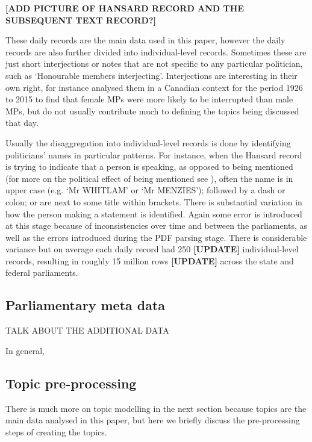 \documentclass[12pt,]{article}
\begin{document}
\textbf{{[}ADD PICTURE OF HANSARD RECORD AND THE SUBSEQUENT TEXT
RECORD?{]}}

These daily records are the main data used in this paper, however the
daily records are also further divided into individual-level records.
Sometimes these are just short interjections or notes that are not
specific to any particular politician, such as `Honourable members
interjecting'. Interjections are interesting in their own right, for
instance \citet{Whyte2017} analysed them in a Canadian context for the
period 1926 to 2015 to find that female MPs were more likely to be
interrupted than male MPs, but do not usually contribute much to
defining the topics being discussed that day.

Usually the disaggregation into individual-level records is done by
identifying politicians' names in particular patterns. For instance,
when the Hansard record is trying to indicate that a person is speaking,
as opposed to being mentioned (for more on the political effect of being
mentioned see \citet{Alexander2018}), often the name is in upper case
(e.g. `Mr WHITLAM' or `Mr MENZIES'); followed by a dash or colon; or are
next to some title within brackets. There is substantial variation in
how the person making a statement is identified. Again some error is
introduced at this stage because of inconsistencies over time and
between the parliaments, as well as the errors introduced during the PDF
parsing stage. There is considerable variance but on average each daily
record had 250 \textbf{{[}UPDATE{]}} individual-level records, resulting
in roughly 15 million rows \textbf{{[}UPDATE{]}} across the state and
federal parliaments.

\subsection{Parliamentary meta data}\label{parliamentary-meta-data}

TALK ABOUT THE ADDITIONAL DATA

In general,

\subsection{Topic pre-processing}\label{topic-pre-processing}

There is much more on topic modelling in the next section because topics
are the main data analysed in this paper, but here we briefly discuss
the pre-processing steps of creating the topics.
\end{document}
